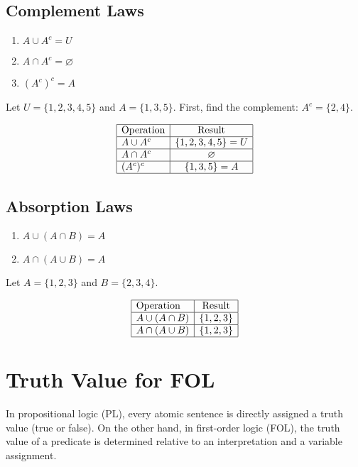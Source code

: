 \documentclass[12pt,a4paper,openany]{article}
\begin{document}
\subsection{Complement Laws}

\begin{enumerate}
    \item $A \cup A^c = U$
    \item $A \cap A^c = \varnothing$
    \item $(A^c)^c = A$
\end{enumerate}

Let $U = \{1, 2, 3, 4, 5\}$ and $A = \{1, 3, 5\}$.  
First, find the complement: $A^c = \{2, 4\}$.

\[
\begin{array}{|l|c|}
\hline
\text{Operation} & \text{Result} \\ \hline
A \cup A^c & \{1, 2, 3, 4, 5\} = U \\ \hline
A \cap A^c & \varnothing \\ \hline
(A^c)^c & \{1, 3, 5\} = A \\ \hline
\end{array}
\]


\subsection{Absorption Laws}

\begin{enumerate}
    \item $A \cup (A \cap B) = A$
    \item $A \cap (A \cup B) = A$
\end{enumerate}

Let $A = \{1, 2, 3\}$ and $B = \{2, 3, 4\}$.

\[
\begin{array}{|l|c|}
\hline
\text{Operation} & \text{Result} \\ \hline
A \cup (A \cap B) & \{1, 2, 3\} \\ \hline
A \cap (A \cup B) & \{1, 2, 3\} \\ \hline
\end{array}
\]


\section{Truth Value for FOL}

In propositional logic (PL), every atomic sentence is directly assigned
a truth value (true or false). On the other hand, in first-order logic
(FOL), the truth value of a predicate is determined relative to an
interpretation and a variable assignment.
\end{document}
